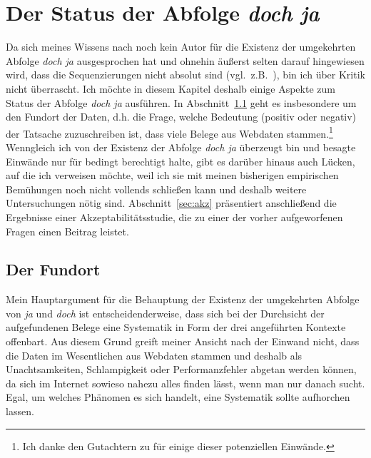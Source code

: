 \section{Der Status der Abfolge \textit{doch ja}}
\label{sec:status}
Da sich meines Wissens nach noch kein Autor für die Existenz der umgekehrten Abfolge \textit{doch ja} ausgesprochen hat und ohnehin äußerst selten darauf hingewie\-sen wird, dass die Sequenzierungen nicht absolut sind (vgl.\ z.B.\ \citealt[289]{Thurmair1989}), bin ich über Kritik nicht überrascht. Ich möchte in diesem Kapitel deshalb einige Aspekte zum Status der Abfolge \textit{doch ja} ausführen. In Abschnitt~\ref{sec:ort} geht es insbesondere um den Fundort der Daten, d.h. die Frage, welche Bedeutung (positiv oder negativ) der Tatsache zuzuschreiben ist, dass viele Belege aus Webdaten stammen.\footnote{Ich danke den Gutachtern zu \citet{Mueller2017b} für einige dieser potenziellen Einwände.} Wenngleich ich von der Existenz der Abfolge \textit{doch ja} überzeugt bin und besagte Einwände nur für bedingt berechtigt halte, gibt es darüber hi\-naus auch Lücken, auf die ich verweisen möchte, weil ich sie mit meinen bisherigen empirischen Bemühungen noch nicht vollends schließen kann und deshalb wei\-tere Untersuchungen nötig sind. Abschnitt~\ref{sec:akz} präsentiert anschließend die Ergebnisse einer Akzeptabilitätsstudie, die zu einer der vorher aufgeworfenen Fragen einen Beitrag leistet.

\subsection{Der Fundort}
\label{sec:ort}
Mein Hauptargument für die Behauptung der Existenz der umgekehrten Abfolge von \textit{ja} und \textit{doch} ist entscheidenderweise, dass sich bei der Durchsicht der aufgefundenen Belege eine Systematik in Form der drei angeführten Kontexte offenbart. Aus diesem Grund greift meiner Ansicht nach der Einwand nicht, dass die Daten im Wesentlichen  aus Webdaten stammen und deshalb als Unachtsamkeiten, Schlampigkeit oder Performanzfehler abgetan werden können, da sich im Internet sowieso nahezu alles finden lässt, wenn man nur danach sucht. Egal, um welches Phänomen es sich handelt, eine Systematik sollte aufhorchen lassen.

